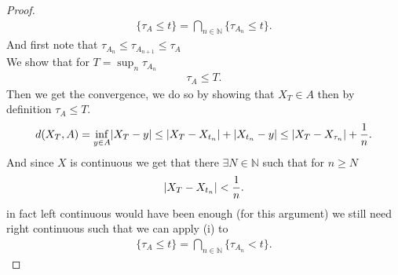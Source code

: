 \begin{proof}
  \begin{align*}
    \{\tau_A \le  t\}  =  \bigcap_{n \in  \mathbb{N}} \{\tau_{A_n} \le  t\}  
  .\end{align*}
  And first note that $\tau_{A_n} \le  \tau_{A_{n+1}} \le  \tau_A $ \\
  We show that  for $T = \sup_{n} \tau_{A_n}$ 
  \begin{align*}
    \tau_A \le  T
  .\end{align*}
  Then we get the convergence, we do so by showing that $X_T \in  A$  then by definition $\tau_A \le  T$. 
  \begin{align*}
    d(X_T,A) = \inf_{y \in  A} \lvert X_T - y\rvert \le  \lvert X_T -X_{t_n}\rvert + \lvert X_{t_n} - y\rvert  \le  \lvert X_T -X_{\tau _n}\rvert + \frac{1}{n}
  .\end{align*}
  And since $X$ is continuous we get that there $\exists N \in  \mathbb{N}$ such that for $n\ge N$ 
  \begin{align*}
    \lvert X_T - X_{t_n}\rvert < \frac{1}{n}
  .\end{align*}
  in fact left continuous would have been enough (for this argument) we still need right continuous such that we can apply (i) to 
  \begin{align*}
    \{\tau_A \le t\}   = \bigcap_{n \in  \mathbb{N}} \{\tau_{A_n} < t\}  
  .\end{align*}
\end{proof}

